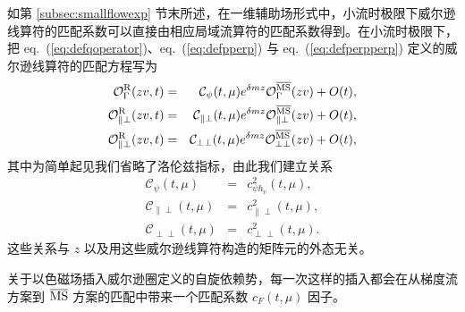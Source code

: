如第 \ref{subsec:smallflowexp} 节末所述，在一维辅助场形式中，小流时极限下威尔逊线算符的匹配系数可以直接由相应局域流算符的匹配系数得到。在小流时极限下，把 eq.~(\ref{eq:defqoperator})、eq.~(\ref{eq:defpperp}) 与 eq.~(\ref{eq:defperpperp}) 定义的威尔逊线算符的匹配方程写为
\begin{eqnarray}
\mathcal{O}_{\Gamma}^{\rm R}(zv, t) &=& \mathcal{C}_{\psi}(t, \mu)e^{\delta m z}\mathcal{O}_{\Gamma}^{\overline{\rm MS}}(zv) + O(t) ,\\
\mathcal{O}_{\|\perp}^{\rm R} (zv, t) &=&  \mathcal{C}_{\|\perp}(t, \mu)e^{\delta m z}\mathcal{O}_{\|\perp}^{\overline{\rm MS}} (zv)+ O(t),\\
\mathcal{O}_{\|\perp}^{\rm R} (zv, t) &=& \mathcal{C}_{\perp\perp}(t, \mu)e^{\delta m z}\mathcal{O}_{\perp\perp}^{\overline{\rm MS}} (zv)+ O(t),
\end{eqnarray}
其中为简单起见我们省略了洛伦兹指标，由此我们建立关系
\begin{eqnarray}
\mathcal{C}_{\psi}(t, \mu) &=& c^2_{\psi h_v}(t, \mu),\\
\mathcal{C}_{\|\perp}(t, \mu) &=& c^2_{\|\perp} (t, \mu),\\
\mathcal{C}_{\perp\perp}(t, \mu) &=& c^2_{\perp\perp} (t, \mu).
\end{eqnarray}
这些关系与 $z$ 以及用这些威尔逊线算符构造的矩阵元的外态无关。

关于以色磁场插入威尔逊圈定义的自旋依赖势，每一次这样的插入都会在从梯度流方案到 $\overline{\rm MS}$ 方案的匹配中带来一个匹配系数 $c_F(t, \mu)$ 因子。
